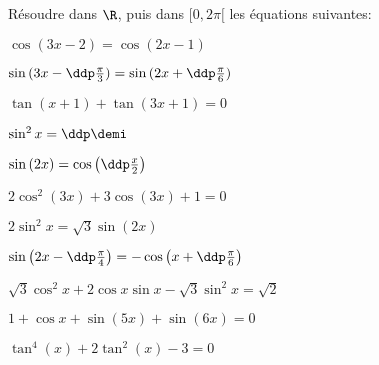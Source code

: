 
\begin{exercice}  \;
R\'esoudre dans $\R$, puis dans $\lbrack 0,2\pi\lbrack$ les \'equations suivantes:\\
\begin{enumerate}
\begin{minipage}[t]{0.45\textwidth}
\item $\cos{(3x-2)}=\cos{(2x-1)}$
\item $\sin{(3x-\ddp\frac{\pi}{3})}=\sin{(2x+\ddp\frac{\pi}{6})}$
\item $\tan{(x+1)}+\tan{(3x+1)}=0$
\item $\sin^2{x}=\ddp\demi$
\item $\sin{(2x)}=\cos{\left(\ddp\frac{x}{2}\right)}$
\end{minipage}
\begin{minipage}[t]{0.45\textwidth}
\item $2\cos^2{(3x)}+3\cos{(3x)}+1=0$
\item $2\sin^2{x}=\sqrt{3}\sin{(2x)}$ 
\item $\sin{\left(2x-\ddp\frac{\pi}{4}\right)}=-\cos{\left(x+\ddp\frac{\pi}{6}\right)}$
\item $\sqrt{3}\cos^2{x}+2\cos{x}\sin{x}-\sqrt{3}\sin^2{x}=\sqrt{2}$
\item $1+\cos{x}+\sin{(5x)}+\sin{(6x)}=0$
\item $\tan^4{(x)}+2\tan^2{(x)}-3=0$
\end{minipage}
\end{enumerate}
\end{exercice}